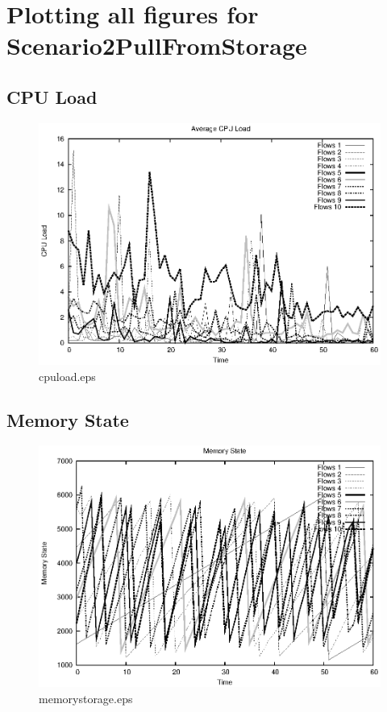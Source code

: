 \documentclass{elsart}
\begin{document}
\section{Plotting all figures for Scenario2PullFromStorage}
\subsection{CPU Load}

\begin{figure}[ht]
\centering
\includegraphics{Scenario2PullFromStorage/cpuload.eps}
\caption{cpuload.eps}\label{fig:cpuload}
\end{figure}

\clearpage
\subsection{Memory State}

\begin{figure}[ht]
\centering
\includegraphics{Scenario2PullFromStorage/memorystorage.eps}
\caption{memorystorage.eps}\label{fig:memorystorage}
\end{figure}
\end{document}

